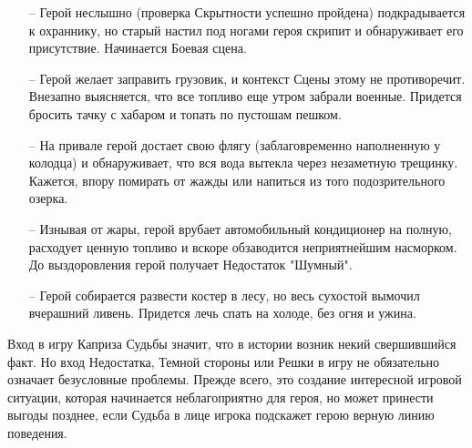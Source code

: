 \begin{enumerate}
\begin{enumerate}
\item[--]Герой неслышно (проверка Скрытности успешно пройдена) подкрадывается к охраннику, но старый настил под ногами героя скрипит и обнаруживает его присутствие. Начинается Боевая сцена.
\item[--]Герой желает заправить грузовик, и контекст Сцены этому не противоречит. Внезапно выясняется, что все топливо еще утром забрали военные. Придется бросить тачку с хабаром и топать по пустошам пешком.
\item[--]На привале герой достает свою флягу (заблаговременно наполненную у колодца) и обнаруживает, что вся вода вытекла через незаметную трещинку. Кажется, впору помирать от жажды или напиться из того подозрительного озерка.
\item[--]Изнывая от жары, герой врубает автомобильный кондиционер на полную, расходует ценную топливо и вскоре обзаводится неприятнейшим насморком. До выздоровления герой получает Недостаток "Шумный".
\item[--]Герой собирается развести костер в лесу, но весь сухостой вымочил вчерашний ливень. Придется лечь спать на холоде, без огня и ужина.
\end{enumerate}
\end{enumerate}
\begin{tcolorbox}
Вход в игру Каприза Судьбы значит, что в истории возник некий свершившийся факт. Но вход Недостатка, Темной стороны или Решки в игру не обязательно означает безусловные проблемы.
\newline Прежде всего, это создание интересной игровой ситуации, которая начинается неблагоприятно для героя, но может принести выгоды позднее, если Судьба в лице игрока подскажет герою верную линию поведения.
\end{tcolorbox}
